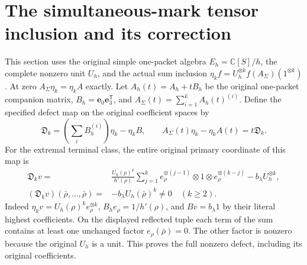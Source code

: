 \documentclass[11pt]{article}
\newcommand{\CC}{\mathbb C}
\begin{document}
\section{The simultaneous-mark tensor inclusion and its correction}
This section uses the original simple one-packet algebra
$E_h=\CC[S]/h$, the complete nonzero unit $U_h$, and the actual
sum inclusion
$\eta_k f=U_h^{\otimes k}f(A_\Sigma)(1^{\otimes k})$.
At zero $A_\Sigma\eta_k=\eta_k A$ exactly. Let
$A_h(t)=A_h+tB_h$ be the original one-packet companion matrix,
$B_h=\mathbf e_0\mathbf e_3^{\mathsf T}$, and
$A_\Sigma(t)=\sum_{i=1}^k A_h(t)^{(i)}$.
Define the specified defect map on the original coefficient spaces by
\begin{equation}\tag{MAR23}\label{mar:tensordefect}
 \mathfrak D_k=\left(\sum_iB_h^{(i)}\right)\eta_k-\eta_k B,
 \qquad A_\Sigma(t)\eta_k-\eta_k A(t)=t\mathfrak D_k.
\end{equation}
For the extremal terminal class, the entire original primary
coordinate of this map is
\begin{equation}\tag{MAR24}\label{mar:Dv}
 \begin{aligned}
 \mathfrak D_kv={}&\frac{U_h(\rho)^k}{h'(\rho)}
 \sum_{j=1}^k e_\rho^{\otimes(j-1)}\otimes1
                         \otimes e_\rho^{\otimes(k-j)}
                 -b_\lambda U_h^{\otimes k},\\
 (\mathfrak D_kv)(\bar\rho,\ldots,\bar\rho)
       ={}&-b_\lambda U_h(\bar\rho)^k\ne0\quad(k\ge2).
 \end{aligned}
\end{equation}
Indeed $\eta_kv=U_h(\rho)^ke_\rho^{\otimes k}$,
$B_he_\rho=1/h'(\rho)$, and $Bv=b_\lambda1$ by their literal
highest coefficients. On the displayed reflected tuple each
term of the sum contains at least one unchanged factor
$e_\rho(\bar\rho)=0$. The other factor is nonzero because the
original $U_h$ is a unit. This proves the full nonzero defect,
including its original coefficients.
\end{document}
